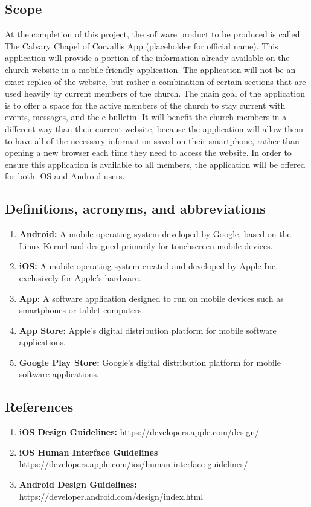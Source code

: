 \documentclass[letterpaper,10pt,draftclsnofoot,onecolumn,compsoc,titlepage]{IEEEtran}
\begin{document}
	\subsection{Scope}
	At the completion of this project, the software product to be produced is called The Calvary Chapel of Corvallis App (placeholder for official name).
	This application will provide a portion of the information already available on the church website in a mobile-friendly application.
	The application will not be an exact replica of the website, but rather a combination of certain sections that are used heavily by current members of the church.
	The main goal of the application is to offer a space for the active members of the church to stay current with events, messages, and the e-bulletin.
	It will benefit the church members in a different way than their current website, because the application will allow them to have all of the necessary information saved on their smartphone, rather than opening a new browser each time they need to access the website.
	In order to ensure this application is available to all members, the application will be offered for both iOS and Android users.

	\subsection{Definitions, acronyms, and abbreviations}

	\begin{enumerate}
		\item \textbf{Android:} A mobile operating system developed by Google, based on the Linux Kernel and designed primarily for touchscreen mobile devices.
		\item \textbf{iOS:} A mobile operating system created and developed by Apple Inc. exclusively for Apple's hardware.
		\item \textbf{App:} A software application designed to run on mobile devices such as smartphones or tablet computers.
		\item \textbf{App Store:} Apple's digital distribution platform for mobile software applications.
		\item \textbf{Google Play Store:} Google's digital distribution platform for mobile software applications.
	\end{enumerate}

	\subsection{References}
	\begin{enumerate}
		\item \textbf{iOS Design Guidelines:} https://developers.apple.com/design/
		\item \textbf{iOS Human Interface Guidelines} https://developers.apple.com/ios/human-interface-guidelines/
		\item \textbf{Android Design Guidelines:} https://developer.android.com/design/index.html
	\end{enumerate}
\end{document}
